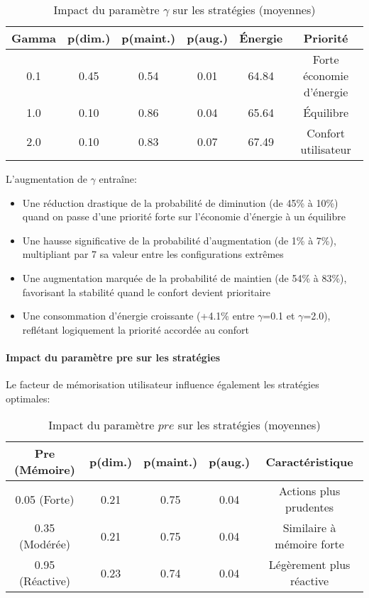 \begin{table}[h]
\centering
\footnotesize
\setlength{\tabcolsep}{4pt}
\begin{tabular}{|c|c|c|c|c|c|}
\hline
\textbf{Gamma} & \textbf{p(dim.)} & \textbf{p(maint.)} & \textbf{p(aug.)} & \textbf{Énergie} & \textbf{Priorité} \\
\hline
0.1 & 0.45 & 0.54 & 0.01 & 64.84 & Forte économie d'énergie \\
\hline
1.0 & 0.10 & 0.86 & 0.04 & 65.64 & Équilibre \\
\hline
2.0 & 0.10 & 0.83 & 0.07 & 67.49 & Confort utilisateur \\
\hline
\end{tabular}
\caption{Impact du paramètre $\gamma$ sur les stratégies (moyennes)}
\label{tab:impact_gamma}
\end{table}

L'augmentation de $\gamma$ entraîne: 
\begin{itemize} 
    \item Une réduction drastique de la probabilité de diminution (de 45\% à 10\%) quand on passe d'une priorité forte sur l'économie d'énergie à un équilibre
    \item Une hausse significative de la probabilité d'augmentation (de 1\% à 7\%), multipliant par 7 sa valeur entre les configurations extrêmes
    \item Une augmentation marquée de la probabilité de maintien (de 54\% à 83\%), favorisant la stabilité quand le confort devient prioritaire
    \item Une consommation d'énergie croissante (+4.1\% entre $\gamma$=0.1 et $\gamma$=2.0), reflétant logiquement la priorité accordée au confort
\end{itemize}

\paragraph{Impact du paramètre pre sur les stratégies}

Le facteur de mémorisation utilisateur influence également les stratégies optimales:

\begin{table}[h]
\centering
\footnotesize
\setlength{\tabcolsep}{4pt}
\begin{tabular}{|c|c|c|c|c|}
\hline
\textbf{Pre (Mémoire)} & \textbf{p(dim.)} & \textbf{p(maint.)} & \textbf{p(aug.)} & \textbf{Caractéristique} \\
\hline
0.05 (Forte) & 0.21 & 0.75 & 0.04 & Actions plus prudentes \\
\hline
0.35 (Modérée) & 0.21 & 0.75 & 0.04 & Similaire à mémoire forte \\
\hline
0.95 (Réactive) & 0.23 & 0.74 & 0.04 & Légèrement plus réactive \\
\hline
\end{tabular}
\caption{Impact du paramètre $pre$ sur les stratégies (moyennes)}
\label{tab:impact_pre}
\end{table}

